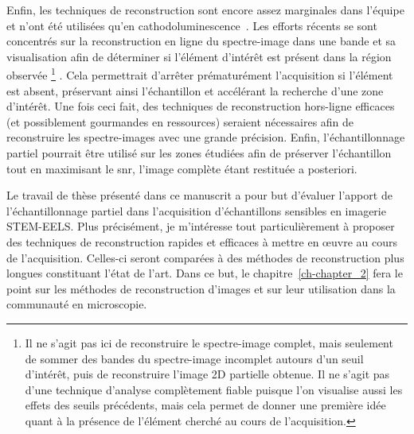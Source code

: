     Enfin, les techniques de reconstruction sont encore assez marginales dans l'équipe et n'ont été utilisées qu'en cathodoluminescence~\cite{zobelli2019spatial}. 
    Les efforts récents se sont concentrés sur la reconstruction en ligne du spectre-image dans une bande et sa visualisation afin de déterminer si l'élément d'intérêt est présent dans la région observée%
    \footnote[][-2\baselineskip]{%
    Il ne s'agit pas ici de reconstruire le spectre-image complet, mais seulement de sommer des bandes du spectre-image incomplet autours d'un seuil d'intérêt, puis de reconstruire l'image 2D partielle obtenue. Il ne s'agit pas d'une technique d'analyse complètement fiable puisque l'on visualise aussi les effets des seuils précédents, mais cela permet de donner une première idée quant à la présence de l'élément cherché au cours de l'acquisition.}%
    . 
    Cela permettrait d'arrêter prématurément l'acquisition si l'élément est absent, préservant ainsi l'échantillon et accélérant la recherche d'une zone d'intérêt. 
    Une fois ceci fait, des techniques de reconstruction hors-ligne efficaces (et possiblement gourmandes en ressources) seraient nécessaires afin de reconstruire les spectre-images avec une grande précision. Enfin, l'échantillonnage partiel pourrait être utilisé sur les zones étudiées afin de préserver l'échantillon tout en maximisant le \gls{snr}, l'image complète étant restituée a posteriori.
    
    Le travail de thèse présenté dans ce manuscrit a pour but d'évaluer l'apport de l'échantillonnage partiel dans l'acquisition d'échantillons sensibles en imagerie STEM-EELS. Plus précisément, je m'intéresse tout particulièrement à proposer des techniques de reconstruction rapides et efficaces à mettre en \oe{}uvre au cours de l'acquisition. Celles-ci seront comparées à des méthodes de reconstruction plus longues constituant l'état de l'art. Dans ce but, le chapitre~\ref{ch-chapter_2} fera le point sur les méthodes de reconstruction d'images et sur leur utilisation dans la communauté en microscopie.
    
    
    
    
    
    

